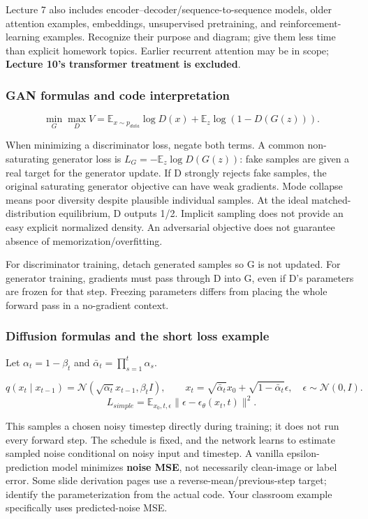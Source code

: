 \documentclass[11pt]{article}
\begin{document}
Lecture 7 also includes encoder–decoder/\allowbreak{}sequence-to-sequence models, older attention examples, embeddings, unsupervised pretraining, and reinforcement-learning examples. Recognize their purpose and diagram; give them less time than explicit homework topics. Earlier recurrent attention may be in scope; \textbf{Lecture 10's transformer treatment is excluded}.

\subsubsection*{GAN formulas and code interpretation}

\[
\min_G\max_D V=\mathbb E_{x\sim p_{data}}\log D(x)+\mathbb E_z\log(1-D(G(z))).
\]

When minimizing a discriminator loss, negate both terms. A common non-saturating generator loss is $L_G=-\mathbb E_z\log D(G(z))$: fake samples are given a real target for the generator update. If D strongly rejects fake samples, the original saturating generator objective can have weak gradients. Mode collapse means poor diversity despite plausible individual samples. At the ideal matched-distribution equilibrium, D outputs 1/\allowbreak{}2. Implicit sampling does not provide an easy explicit normalized density. An adversarial objective does not guarantee absence of memorization/\allowbreak{}overfitting.

For discriminator training, detach generated samples so G is not updated. For generator training, gradients must pass through D into G, even if D's parameters are frozen for that step. Freezing parameters differs from placing the whole forward pass in a no-gradient context.

\subsubsection*{Diffusion formulas and the short loss example}

Let $\alpha_t=1-\beta_t$ and $\bar\alpha_t=\prod_{s=1}^t\alpha_s$.

\[
q(x_t\mid x_{t-1})=\mathcal N(\sqrt{\alpha_t}x_{t-1},\beta_tI),\qquad
x_t=\sqrt{\bar\alpha_t}x_0+\sqrt{1-\bar\alpha_t}\epsilon,\quad\epsilon\sim\mathcal N(0,I).
\]
\[
L_{simple}=\mathbb E_{x_0,t,\epsilon}\|\epsilon-\epsilon_\theta(x_t,t)\|^2.
\]

This samples a chosen noisy timestep directly during training; it does not run every forward step. The schedule is fixed, and the network learns to estimate sampled noise conditional on noisy input and timestep. A vanilla epsilon-prediction model minimizes \textbf{noise MSE}, not necessarily clean-image or label error. Some slide derivation pages use a reverse-mean/\allowbreak{}previous-step target; identify the parameterization from the actual code. Your classroom example specifically uses predicted-noise MSE.
\end{document}
